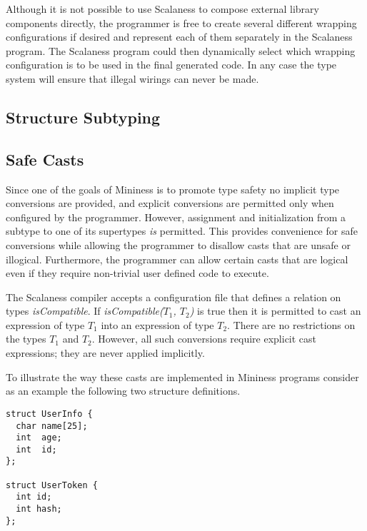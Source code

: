 Although it is not possible to use Scalaness to compose external library components directly,
the programmer is free to create several different wrapping configurations if desired and
represent each of them separately in the Scalaness program. The Scalaness program could then
dynamically select which wrapping configuration is to be used in the final generated code. In
any case the type system will ensure that illegal wirings can never be made.

\subsection{Structure Subtyping}
\label{section-structure-subtyping}


\subsection{Safe Casts}
\label{section-safe-casts}

Since one of the goals of Mininess is to promote type safety no implicit type conversions are
provided, and explicit conversions are permitted only when configured by the programmer.
However, assignment and initialization from a subtype to one of its supertypes \emph{is}
permitted. This provides convenience for safe conversions while allowing the programmer to
disallow casts that are unsafe or illogical. Furthermore, the programmer can allow certain casts
that are logical even if they require non-trivial user defined code to execute.

The Scalaness compiler accepts a configuration file that defines a relation on types
\textit{isCompatible}. If \textit{isCompatible($T_1$, $T_2$)} is true then it is permitted to
cast an expression of type $T_1$ into an expression of type $T_2$. There are no restrictions on
the types $T_1$ and $T_2$. However, all such conversions require explicit cast expressions; they
are never applied implicitly.

To illustrate the way these casts are implemented in Mininess programs consider as an example
the following two structure definitions.

\singlespace
\begin{lstlisting}[language=nesC]
struct UserInfo {
  char name[25];
  int  age;
  int  id;
};

struct UserToken {
  int id;
  int hash;
};
\end{lstlisting}
\primaryspacing

